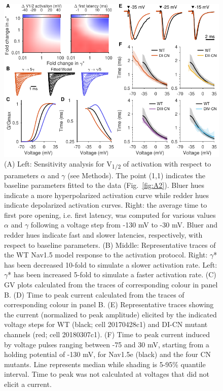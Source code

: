 \begin{figure}[t]
\centering
\includegraphics[width=120mm]{Figures/AppendixA/figure03.pdf}
\caption{
(A) Left: Sensitivity analysis for V\textsubscript{1/2} of activation with respect to parameters $\alpha$ and $\gamma$ (see Methods). The point (1,1) indicates the baseline parameters fitted to the data (Fig.~\ref{fig:A2}). Bluer hues indicate a more hyperpolarized activation curve while redder hues indicate depolarized activation curves. Right: the average time to first pore opening, i.e. first latency, was computed for various values $\alpha$ and $\gamma$ following a voltage step from -130 mV to -30 mV. Bluer and redder hues indicate fast and slower latencies, respectively, with respect to baseline parameters.
(B) Middle: Representative traces of the WT Nav1.5 model response to the activation protocol. Right: $\gamma$* has been decreased 10-fold to simulate a slower activation rate. Left: $\gamma$* has been increased 5-fold to simulate a faster activation rate.
(C) GV plots calculated from the traces of corresponding colour in panel B. 
(D) Time to peak current calculated from the traces of corresponding colour in panel B. 
(E) Representative traces showing the current (normalized to peak amplitude) elicited by the indicated voltage steps for WT (black; cell 20170428c1) and DI-CN mutant channels (red; cell 20180307c1). 
(F) Time to peak current induced by voltage pulses ranging between -75 and 30 mV, starting from a holding potential of -130 mV, for Nav1.5e (black) and the four CN mutants. Line represents median while shading is 5-95\% quantile interval. Time to peak was not calculated at voltages that did not elicit a current.
}
\label{fig:A3}
\end{figure}

